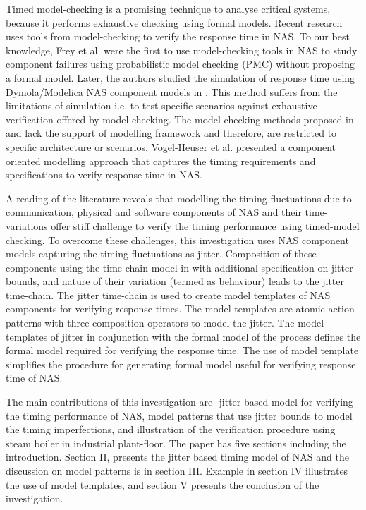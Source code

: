 \documentclass[letterpaper, 10 pt, conference]{ieeeconf}
\begin{document}
Timed model-checking is a promising technique to analyse critical systems, because it performs exhaustive checking using formal models. Recent research uses tools from model-checking to verify the response time in NAS. To our best knowledge, Frey et al. \cite{Frey2005} were the first to use model-checking tools in NAS to study component failures using probabilistic model checking (PMC) without proposing a formal model. Later, the authors studied the simulation of response time using Dymola/Modelica NAS component models in \cite{Frey2007}. This method suffers from the limitations of simulation i.e. to test specific scenarios against exhaustive verification offered by model checking. The model-checking methods proposed in \cite{Mazz2010} and \cite{Ruel2009} lack the support of modelling framework and therefore, are restricted to specific architecture or scenarios. Vogel-Heuser et al. \cite{Vogel2011} presented a component oriented modelling approach that captures the timing requirements and specifications to verify response time in NAS.

A reading of the literature reveals that modelling the timing fluctuations due to communication, physical and software components of NAS and their time-variations offer stiff challenge to verify the timing performance using timed-model checking. To overcome these challenges, this investigation uses NAS component models capturing the timing fluctuations as jitter. Composition of these components using the time-chain model in \cite{Vogel2011} with additional specification on jitter bounds, and nature of their variation (termed as behaviour) leads to the jitter time-chain. The jitter time-chain is used to create model templates of NAS components for verifying response times. The model templates are atomic action patterns with three composition operators to model the jitter. The model templates of jitter in conjunction with the formal model of the process defines the formal model required for verifying the response time. The use of model template simplifies the procedure for generating formal model useful for verifying response time of NAS. 

The main contributions of this investigation are- jitter based model for verifying the timing performance of NAS, model patterns that use jitter bounds to model the timing imperfections, and illustration of the verification procedure using steam boiler in industrial plant-floor. The paper has five sections including the introduction. Section II, presents the jitter based timing model of NAS and the discussion on model patterns is in section III. Example in section IV illustrates the use of model templates, and section V presents the conclusion of the investigation.
\end{document}
